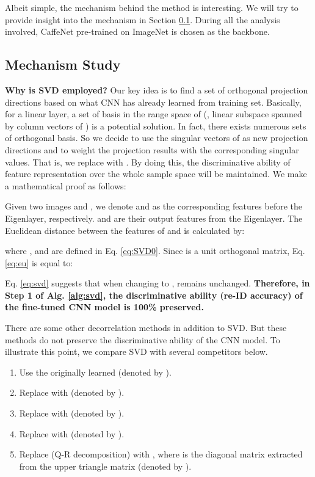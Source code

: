 \documentclass[10pt,twocolumn,letterpaper]{article}
\begin{document}
Albeit simple, the mechanism behind the method is interesting. We will try to provide insight into the mechanism in Section \ref{sec:mechanism}. During all the analysis involved, CaffeNet pre-trained on ImageNet is chosen as the backbone. 

\subsection{Mechanism Study} \label{sec:mechanism}


\textbf{Why is SVD employed?} 
Our key idea is to find a set of orthogonal projection directions based on what CNN has already learned from training set. Basically, for a linear layer, a set of basis in the range space of  (\ie, linear subspace spanned by column vectors of ) is a potential solution. In fact, there exists numerous sets of orthogonal basis. So we decide to use the singular vectors of  as new projection directions and to weight the projection results with the corresponding singular values. That is, we replace  with . By doing this, {the discriminative ability  of feature representation over the whole sample space will be maintained}. We make a mathematical proof as follows:

Given two images  and , we denote  and  as the corresponding features  before the Eigenlayer, respectively.  and  are their output features from the Eigenlayer. The Euclidean distance  between the features of  and  is calculated by:
{\setlength\abovedisplayskip{5pt}
\setlength\belowdisplayskip{7pt}

}where ,  and  are defined in Eq. \ref{eq:SVD0}. Since  is a unit orthogonal matrix, Eq. \ref{eq:eu} is equal to:

Eq. \ref{eq:svd} suggests that when changing  to ,  remains unchanged. \textbf{Therefore, in Step 1 of Alg. \ref{alg:svd}, the discriminative ability (re-ID accuracy) of the fine-tuned CNN model is 100\% preserved.}

There are some other decorrelation methods in addition to SVD. But these methods do not preserve the discriminative ability of the CNN model. To illustrate this point, we compare SVD with several competitors below. 
\begin{enumerate}
\setlength{\itemsep}{0.4ex} \item Use the originally learned  (denoted by ).
\item Replace  with  (denoted by ).
\item Replace  with  (denoted by ).
\item Replace  with  (denoted by ).
\item  Replace  (Q-R decomposition) with , where  is the diagonal matrix extracted from the upper triangle matrix  (denoted by ).
\end{enumerate}
\end{document}
